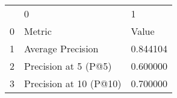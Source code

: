 \begin{tabular}{lll}
 & 0 & 1 \\
0 & Metric & Value \\
1 & Average Precision & 0.844104 \\
2 & Precision at 5 (P@5) & 0.600000 \\
3 & Precision at 10 (P@10) & 0.700000 \\
\end{tabular}
